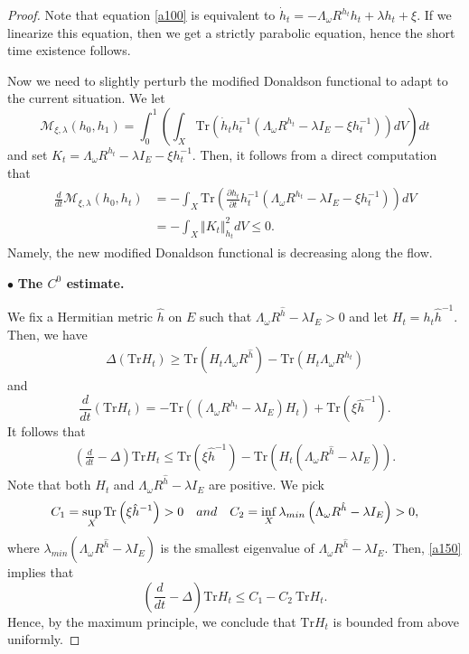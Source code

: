 \documentclass[10pt,a4paper]{amsart}
\newcommand{\M}{{\mathcal M}}
\newcommand{\lb}{\left (}
\newcommand{\pa}{\partial}
\newcommand{\rb}{\right )}
\newcommand{\tr}{\text{Tr}}
\begin{document}
\begin{proof}
Note that equation \eqref{a100} is equivalent to $\dot h_t=-\Lambda_\omega R^{h_t}h_t+\lambda h_t+\xi$. If we linearize this equation, then we get a strictly parabolic equation, hence the short time existence follows.

Now we need to slightly perturb the modified Donaldson functional to adapt to the current situation. We let
\[
\M_{\xi,\lambda}\lb h_0,h_1\rb=\int_0^1 \lb \int_X \tr \lb \dot h_t h_t^{-1}\lb \Lambda_\omega R^{h_t}-\lambda I_E-\xi h_t^{-1}\rb\rb dV\rb dt
\]
and set $K_t=\Lambda_\omega R^{h_t}-\lambda I_E-\xi h_t^{-1}$. Then, it follows from a direct computation that
\begin{align*}
\begin{split}
\frac{d}{dt}\M_{\xi,\lambda}\lb h_0,h_t\rb & =-\int_X \tr\lb\frac{\pa h_t}{\pa t}h_t^{-1} \lb \Lambda_\omega R^{h_t}-\lambda I_E-\xi h_t^{-1}\rb\rb dV \\
& =-\int_X \Vert K_t\Vert_{h_t}^2 dV\leq 0.
\end{split}
\end{align*}
Namely, the new modified Donaldson functional is decreasing along the flow.

\medskip
\noindent $\bullet$  \textbf{The $C^0$ estimate.}

\smallskip

We fix a Hermitian metric $\hat h$ on $E$ such that $\Lambda_\omega R^{\hat h}-\lambda I_E>0$ and let $H_t=h_t\hat h^{-1}$. Then, we have
\begin{eqnarray}\label{a140}
\Delta \lb \tr H_t\rb \geq \tr \lb H_t \Lambda_\omega R^{\hat h}\rb-\tr \lb H_t \Lambda_\omega R^{h_t}\rb
\end{eqnarray}
and
\[
\frac{d}{dt} \lb \tr H_t\rb =-\tr \lb \lb\Lambda_\omega R^{h_t}-\lambda I_E\rb H_t \rb+\tr\lb \xi \hat h^{-1}\rb.
\]
It follows that
\begin{eqnarray}\label{a150}
\lb \frac{d}{dt}-\Delta\rb\tr H_t\leq \tr\lb \xi  \hat h^{-1}\rb-\tr \lb H_t \lb\Lambda_\omega R^{\hat h}-\lambda I_E\rb\rb.
\end{eqnarray}
Note that both $H_t$ and $\Lambda_\omega R^{\hat h}-\lambda I_E$ are positive. We pick
\[C_1=\sup_X \tr\lb \xi  \hat h^{-1}\rb>0 \quad \rm{and} \quad C_2=\inf_X \lambda_{min}\lb \Lambda_\omega R^{\hat h}-\lambda I_E\rb>0,\]
where $\lambda_{min}\lb \Lambda_\omega R^{\hat h}-\lambda I_E\rb$ is the smallest eigenvalue of $\Lambda_\omega R^{\hat h}-\lambda I_E$. Then,  \eqref{a150} implies that
\[
\lb \frac{d}{dt}-\Delta\rb\tr H_t\leq C_1-C_2 \ \!\tr H_t.
\]
Hence, by the maximum principle,  we conclude  that $\tr H_t$ is bounded from above uniformly.


\end{proof}
\end{document}
